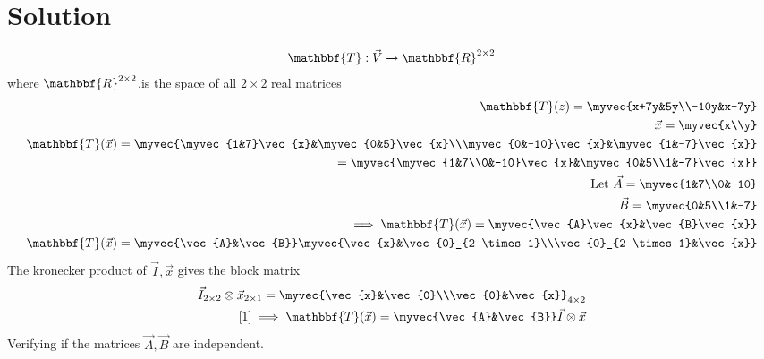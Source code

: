 \documentclass[journal,12pt,twocolumn]{IEEEtran}
\begin{document}
\section{Solution}
\begin{align}
    \mathbbf{T}:\vec{V}\xrightarrow{}\mathbbf{R}^{2 \times 2}
\end{align}
where $\mathbbf{R}^{2 \times 2}$,is the space of all $2 \times 2$ real matrices\\
\begin{align}
 \mathbbf{T}(z)=\myvec{x+7y&5y\\-10y&x-7y}\\
 \vec{x}=\myvec{x\\y}\\
 \mathbbf{T}(\vec{x})=\myvec{\myvec{1&7}\vec{x}&\myvec{0&5}\vec{x}\\\myvec{0&-10}\vec{x}&\myvec{1&-7}\vec{x}}\\
 =\myvec{\myvec{1&7\\0&-10}\vec{x}&\myvec{0&5\\1&-7}\vec{x}}\\
 \text{Let } \vec{A}=\myvec{1&7\\0&-10}\\
 \vec{B}=\myvec{0&5\\1&-7}\\
 \implies  \mathbbf{T}(\vec{x})=\myvec{\vec{A}\vec{x}&\vec{B}\vec{x}}\\
  \mathbbf{T}(\vec{x})=\myvec{\vec{A}&\vec{B}}\myvec{\vec{x}&\vec{0}_{2 \times 1}\\\vec{0}_{2 \times 1}&\vec{x}}\label{1}
\end{align}
The kronecker product of $\vec{I},\vec{x}$ gives the block matrix
\begin{align}
    \vec{I}_{2 \times 2}\otimes \vec{x}_{2\times 1}=\myvec{\vec{x}&\vec{0}\\\vec{0}&\vec{x}}_{4 \times 2}\\
    \eqref{1} \implies  \mathbbf{T}(\vec{x})= \myvec{\vec{A}&\vec{B}}\vec{I}\otimes \vec{x}
\end{align}
Verifying if the matrices $\vec{A},\vec{B}$ are independent.
\end{document}
